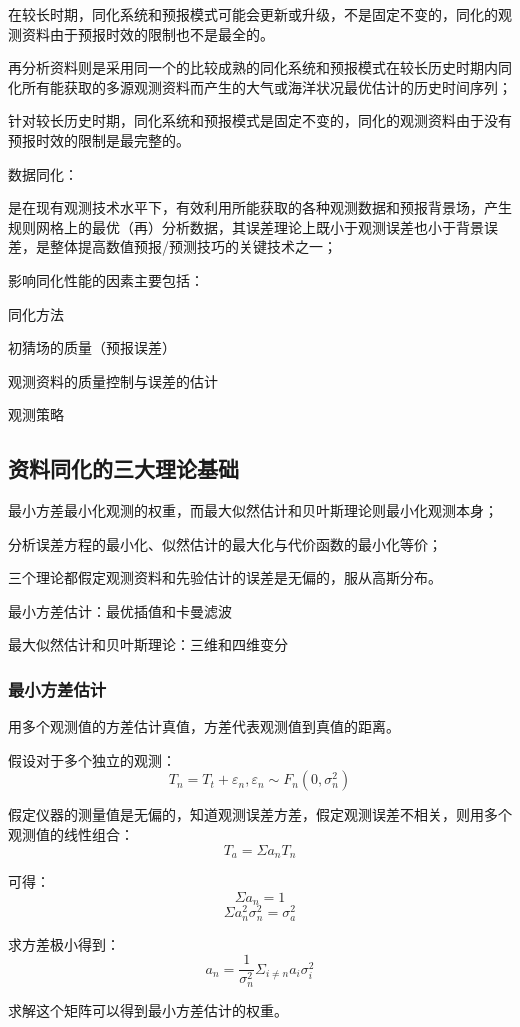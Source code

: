 \documentclass{article}
\begin{document}
在较长时期，同化系统和预报模式可能会更新或升级，不是固定不变的，同化的观测资料由于预报时效的限制也不是最全的。

再分析资料则是采用同一个的比较成熟的同化系统和预报模式在较长历史时期内同化所有能获取的多源观测资料而产生的大气或海洋状况最优估计的历史时间序列；

针对较长历史时期，同化系统和预报模式是固定不变的，同化的观测资料由于没有预报时效的限制是最完整的。

数据同化：

是在现有观测技术水平下，有效利用所能获取的各种观测数据和预报背景场，产生规则网格上的最优（再）分析数据，其误差理论上既小于观测误差也小于背景误差，是整体提高数值预报/预测技巧的关键技术之一；

影响同化性能的因素主要包括：

同化方法

初猜场的质量（预报误差）

观测资料的质量控制与误差的估计

观测策略


\subsection{资料同化的三大理论基础}
最小方差最小化观测的权重，而最大似然估计和贝叶斯理论则最小化观测本身；

分析误差方程的最小化、似然估计的最大化与代价函数的最小化等价；

三个理论都假定观测资料和先验估计的误差是无偏的，服从高斯分布。

最小方差估计：最优插值和卡曼滤波

最大似然估计和贝叶斯理论：三维和四维变分

\subsubsection{最小方差估计}
用多个观测值的方差估计真值，方差代表观测值到真值的距离。

假设对于多个独立的观测：
$$T_n = T_t + \varepsilon_n, \varepsilon_n\sim F_n(0, \sigma^2_n)$$

假定仪器的测量值是无偏的，知道观测误差方差，假定观测误差不相关，则用多个观测值的线性组合：
$$T_a = \Sigma a_n T_n$$

可得：
$$\Sigma a_n = 1$$
$$\Sigma a_n^2 \sigma_n^2 = \sigma_a^2$$

求方差极小得到：
$$a_n = \frac{1}{\sigma_n^2}\Sigma_{i\ne n} a_i\sigma_i^2$$

求解这个矩阵可以得到最小方差估计的权重。
\end{document}
